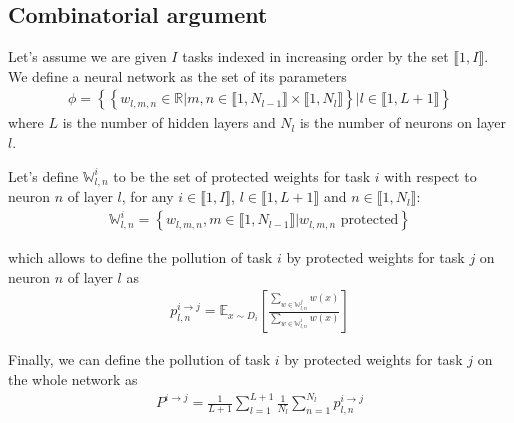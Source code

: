 \documentclass[11pt]{article}
\newcommand{\intset}[2]{\llbracket #1, #2 \rrbracket}
\begin{document}
\subsection{Combinatorial argument}


\vspace{1mm}
\noindent
Let's assume we are given $I$ tasks indexed in increasing order by the set $\intset{1}{I}$. We define a neural network as the set of its parameters
\begin{align}
    \phi = \left\{\left\{ w_{l,m,n} \in \mathbb{R} | m,n \in \llbracket 1, N_{l-1} \rrbracket \times \llbracket 1, N_{l} \rrbracket \right\} | l \in \llbracket 1, L+1 \rrbracket \right\}
\end{align}
where $L$ is the number of hidden layers and $N_l$ is the number of neurons on layer $l$.

\vspace{1mm}
\noindent
Let's define $\mathbb{W}_{l,n}^i$ to be the set of protected weights for task $i$ with respect to neuron $n$ of layer $l$, for any $i \in \intset{1}{I}$, $l \in \intset{1}{L+1}$ and $n \in \intset{1}{N_l}$:
\begin{align}
    \mathbb{W}_{l,n}^i = \left\{ w_{l,m,n}, m \in \intset{1}{N_{l-1}} | w_{l,m,n} \text{ protected} \right\}
\end{align}

\vspace{1mm}
\noindent
which allows to define the pollution of task $i$ by protected weights for task $j$ on neuron $n$ of layer $l$ as
\begin{align}
    p_{l,n}^{i\rightarrow j} = \mathbb{E}_{x \sim D_i}\left[\frac{\sum_{w \in \mathbb{W}_{l,n}^j}{w(x)}}{\sum_{w \in \mathbb{W}_{l,n}^i}{w(x)}}\right]
\end{align}

\vspace{1mm}
\noindent
Finally, we can define the pollution of task $i$ by protected weights for task $j$ on the whole network as
\begin{align}
    P^{i\rightarrow j} = \frac{1}{L+1}\sum_{l=1}^{L+1}{\frac{1}{N_l}\sum_{n=1}^{N_l}{p_{l,n}^{i\rightarrow j}}}
\end{align}
\end{document}
